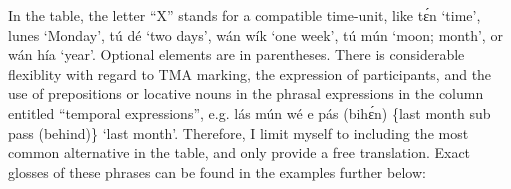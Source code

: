 In the table, the letter “X” stands for a compatible time-unit, like tɛ́n ‘time’, lunes ‘Monday’, tú dé ‘two days’, wán wík ‘one week’, tú mún ‘moon; month’, or wán hía ‘year’. Optional elements are in parentheses. There is considerable flexiblity with regard to TMA marking, the expression of participants, and the use of prepositions or locative nouns{\fff} in the phrasal expressions in the column entitled “temporal expressions”, e.g. lás mún wé e pás (bihɛ́n) \{last month sub pass (behind)\} ‘last month’. Therefore, I limit myself to including the most common alternative in the table, and only provide a free translation. Exact glosses of these phrases can be found in the examples further below:


